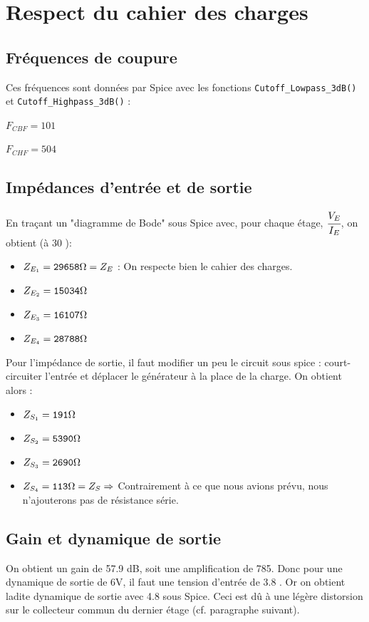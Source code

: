\documentclass[11pt;a4paper]{report}
\begin{document}
  \section{Respect du cahier des charges}
   \subsection{Fréquences de coupure}
    Ces fréquences sont données par Spice avec les fonctions \verb|Cutoff_Lowpass_3dB()| et \verb|Cutoff_Highpass_3dB()| :

    $F_{CBF} = 101$ \hertz

    $F_{CHF} = 504$ \kilo\hertz

   \subsection{Impédances d'entrée et de sortie}
    En traçant un "diagramme de Bode" sous Spice avec, pour chaque étage, $\cfrac{V_E}{I_E}$, on obtient (à 30 \kilo\hertz):
    \begin{itemize}
     \item $Z_{E_1} = \verb|29658|\ohm = Z_E$ : On respecte bien le cahier des charges.
     \item $Z_{E_2} = \verb|15034|\ohm$
     \item $Z_{E_3} = \verb|16107|\ohm$
     \item $Z_{E_4} = \verb|28788|\ohm$
    \end{itemize}

    Pour l'impédance de sortie, il faut modifier un peu le circuit sous spice : court-circuiter l'entrée et déplacer le générateur à la place de la charge. On obtient alors :
    \begin{itemize}
     \item $Z_{S_1} = \verb|191|\ohm$
     \item $Z_{S_2} = \verb|5390|\ohm$
     \item $Z_{S_3} = \verb|2690|\ohm$
     \item $Z_{S_4} = \verb|113|\ohm = Z_S \Rightarrow$ Contrairement à ce que nous avions prévu, nous n'ajouterons pas de résistance série.
    \end{itemize}

   \subsection{Gain et dynamique de sortie}
    On obtient un gain de 57.9 dB, soit une amplification de 785.
    Donc pour une dynamique de sortie de 6V, il faut une tension d'entrée de 3.8 \milli\volt.
    Or on obtient ladite dynamique de sortie avec 4.8 \milli\volt  sous Spice. Ceci est dû à une légère distorsion sur le collecteur commun du dernier étage (cf. paragraphe suivant).
   
\end{document}
